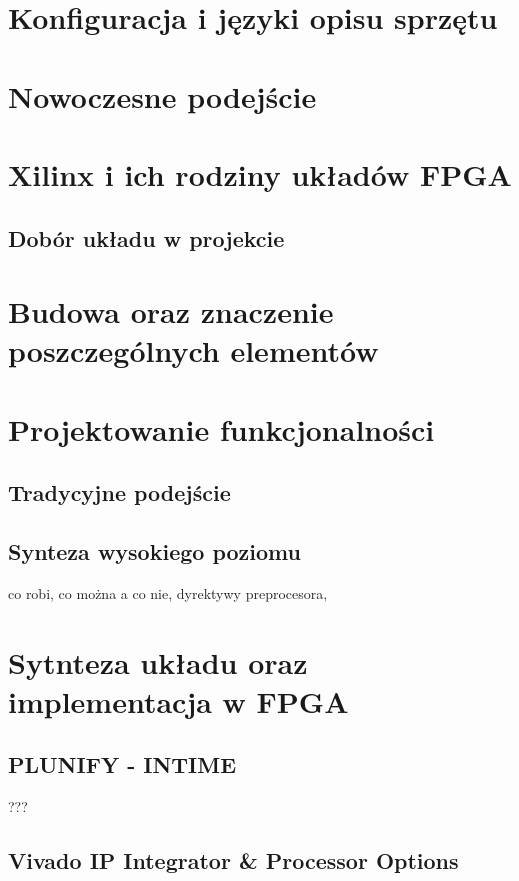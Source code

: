 \section{Konfiguracja i języki opisu sprzętu}
\section{Nowoczesne podejście}

\section{Xilinx i ich rodziny układów FPGA}
\subsection{Dobór układu w projekcie}

\section{Budowa oraz znaczenie poszczególnych elementów}

\section{Projektowanie funkcjonalności}
\subsection{Tradycyjne podejście}
\subsection{Synteza wysokiego poziomu}
co robi, co można a co nie, dyrektywy preprocesora,

\section{Sytnteza układu oraz implementacja w FPGA}
\subsection{PLUNIFY - INTIME}
???
\subsection{Vivado IP Integrator \& Processor Options}

